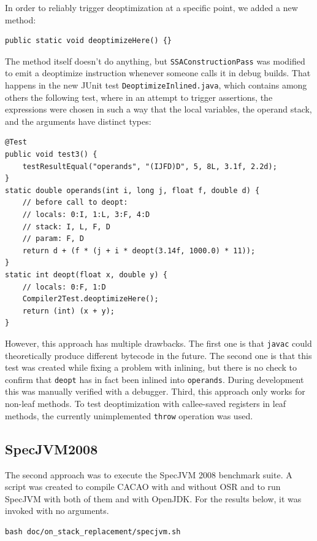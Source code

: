\documentclass[draft,final]{vutinfth} %
\begin{document}
    In order to reliably trigger deoptimization at a specific point, we added a new method:

    \begin{lstlisting}
public static void deoptimizeHere() {}
    \end{lstlisting}

    The method itself doesn't do anything,
    but \lstinline{SSAConstructionPass} was modified
    to emit a deoptimize instruction whenever someone calls it in debug builds.
    That happens in the new JUnit test \lstinline{DeoptimizeInlined.java},
    which contains among others the following test,
    where in an attempt to trigger assertions,
    the expressions were chosen in such a way that the local variables,
    the operand stack,
    and the arguments
    have distinct types:
    \begin{lstlisting}
@Test
public void test3() {
    testResultEqual("operands", "(IJFD)D", 5, 8L, 3.1f, 2.2d);
}
static double operands(int i, long j, float f, double d) {
    // before call to deopt:
    // locals: 0:I, 1:L, 3:F, 4:D
    // stack: I, L, F, D
    // param: F, D
    return d + (f * (j + i * deopt(3.14f, 1000.0) * 11));
}
static int deopt(float x, double y) {
    // locals: 0:F, 1:D
    Compiler2Test.deoptimizeHere();
    return (int) (x + y);
}
    \end{lstlisting}

    However, this approach has multiple drawbacks.
    The first one is that \texttt{javac} could theoretically produce different bytecode in the future.
    The second one is that this test was created while fixing a problem with inlining,
    but there is no check to confirm that \lstinline{deopt}
    has in fact been inlined into \lstinline{operands}.
    During development this was manually verified with a debugger.
    Third, this approach only works for non-leaf methods.
    To test deoptimization with callee-saved registers in leaf methods,
    the currently unimplemented \lstinline{throw} operation was used.

    \subsection{SpecJVM2008}

    The second approach was to execute the SpecJVM 2008\cite{specjvm2008} benchmark suite.
    A script was created to compile CACAO with and without OSR and to run SpecJVM with both of them
    and with OpenJDK.
    For the results below, it was invoked with no arguments.
    \begin{lstlisting}
bash doc/on_stack_replacement/specjvm.sh
    \end{lstlisting}
\end{document}
